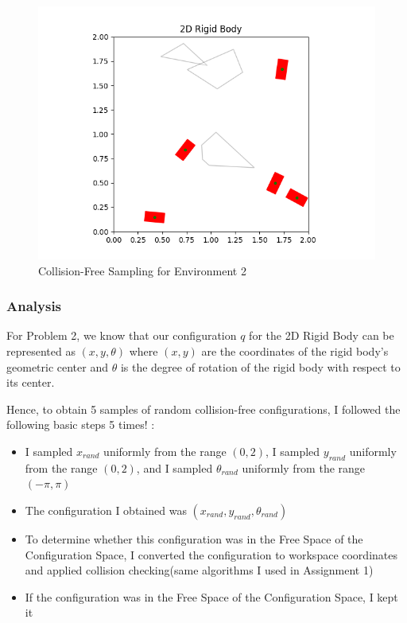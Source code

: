 \documentclass{article}
\begin{document}
\begin{figure}[h!]
	\includegraphics[width= 0.9 \linewidth]{P2_collision_free(2).png}
	\centering
	\caption{Collision-Free Sampling for Environment 2}
	\label{P2_collision_free(2).png}
\end{figure}

\newpage 
\subsubsection{Analysis}
For Problem 2, we know that our configuration $q$ for the 2D Rigid Body can be represented as $(x, y, \theta)$ where $(x, y)$ are the coordinates of the rigid body's geometric center and $\theta$ is the degree of rotation of the rigid body with respect to its center. 

Hence, to obtain 5 samples of random collision-free configurations, I followed the following basic steps 5 times! : 
\begin{itemize}
    \item I sampled $x_{rand}$ uniformly from the range $(0, 2)$, I sampled $y_{rand}$ uniformly from the range $(0, 2)$, and I sampled $\theta_{rand}$ uniformly from the range $(-\pi, \pi)$
    \item The configuration I obtained was $(x_{rand}, y_{rand}, \theta_{rand})$
    \item To determine whether this configuration was in the Free Space of the Configuration Space, I converted the configuration to workspace coordinates and applied collision checking(same algorithms I used in Assignment 1)
    \item If the configuration was in the Free Space of the Configuration Space, I kept it
\end{itemize}
\end{document}
